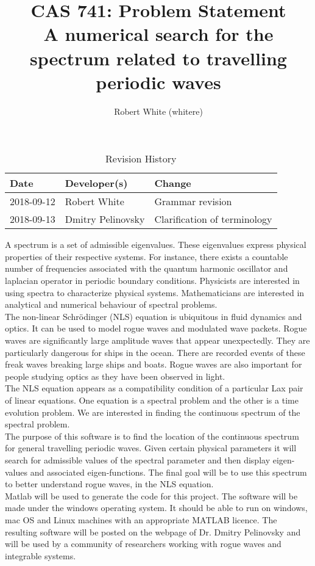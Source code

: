 \documentclass{article}
\title{CAS 741: Problem Statement\\A numerical search for the spectrum related to travelling periodic waves}
\author{Robert White (whitere)}
\date{}
\begin{document}
\maketitle
\begin{table}[hp]
\caption{Revision History} \label{TblRevisionHistory}
\begin{tabularx}{\textwidth}{llX}
\toprule
\textbf{Date} & \textbf{Developer(s)} & \textbf{Change}\\
\midrule
2018-09-12 & Robert White & Grammar revision \\
2018-09-13 & Dmitry Pelinovsky & Clarification of terminology\\
\bottomrule
\end{tabularx}
\end{table}

A spectrum is a set of admissible eigenvalues. These eigenvalues express physical properties of their respective systems. For instance, there exists a countable number of frequencies associated with the quantum harmonic oscillator and laplacian operator in periodic boundary conditions. Physicists are interested in using spectra to characterize physical systems. Mathematicians are interested in analytical and numerical behaviour of spectral problems.\\

The non-linear Schr\"{o}dinger (NLS) equation is ubiquitous in fluid dynamics and optics. It can be used to model rogue waves and modulated wave packets. Rogue waves are significantly large amplitude waves that appear unexpectedly. They are particularly dangerous for ships in the ocean. There are recorded events of these freak waves breaking large ships and boats. Rogue waves are also important for people studying optics as they have been observed in light. \\

The NLS equation appears as a compatibility condition of a particular Lax pair of linear equations. One equation is a spectral problem and the other is a time evolution problem. We are interested in finding the continuous spectrum of the spectral problem. \\

The purpose of this software is to find the location of the continuous spectrum for general travelling periodic waves. Given certain physical parameters it will search for admissible values of the spectral parameter and then display eigen-values and associated eigen-functions. The final goal will be to use this spectrum to better understand rogue waves, in the NLS equation.  \\ 

Matlab will be used to generate the code for this project. The software will be made under the windows operating system. It should be able to run on windows, mac OS and Linux machines with an appropriate MATLAB licence. The resulting software will be posted on the webpage of Dr. Dmitry Pelinovsky and will be used by a community of researchers working with rogue waves and integrable systems. 

\end{document}
